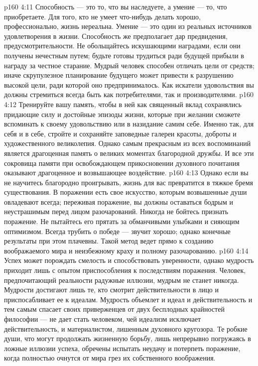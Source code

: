 \vs p160 4:11 Способность --- это то, что вы наследуете, а умение --- то, что приобретаете. Для того, кто не умеет что\hyp{}нибудь делать хорошо, профессионально, жизнь нереальна. Умение --- это один из реальных источников удовлетворения в жизни. Способность же предполагает дар предвидения, предусмотрительности. Не обольщайтесь искушающими наградами, если они получены нечестным путем; будьте готовы трудиться ради будущей прибыли в награду за честное старание. Мудрый человек способен отличать цели от средств; иначе скрупулезное планирование будущего может привести к разрушению высокой цели, ради которой оно предпринималось. Как искатели удовольствия вы должны стремиться всегда быть как потребителями, так и производителями.
\vs p160 4:12 Тренируйте вашу память, чтобы в ней как священный вклад сохранялись придающие силу и достойные эпизоды жизни, которые при желании сможете вспоминать к своему удовольствию или в назидание самим себе. Именно так, для себя и в себе, стройте и сохраняйте заповедные галереи красоты, доброты и художественного великолепия. Однако самым прекрасным из всех воспоминаний является драгоценная память о великих моментах благородной дружбы. И все эти сокровища памяти при освобождающем прикосновении духовного почитания оказывают драгоценное и возвышающее воздействие.
\vs p160 4:13 Однако если вы не научитесь благородно проигрывать, жизнь для вас превратится в тяжкое бремя существования. В поражении есть свое искусство, которым возвышенные души овладевают всегда; переживая поражение, вы должны оставаться бодрым и неустрашимым перед лицом разочарований. Никогда не бойтесь признать поражение. Не пытайтесь его прятать за обманчивыми улыбками и сияющим оптимизмом. Всегда трубить о победе --- звучит хорошо; однако конечные результаты при этом плачевны. Такой метод ведет прямо к созданию воображаемого мира и неизбежному краху и полному разочарованию.
\vs p160 4:14 Успех может порождать смелость и способствовать уверенности, однако мудрость приходит лишь с опытом приспособления к последствиям поражения. Человек, предпочитающий реальности радужные иллюзии, мудрым не станет никогда. Мудрости достигают лишь те, кто смотрит действительности в лицо и приспосабливает ее к идеалам. Мудрость объемлет и идеал и действительность и тем самым спасает своих приверженцев от двух бесплодных крайностей философии --- не дает стать человеком, чей идеализм исключает действительность, и материалистом, лишенным духовного кругозора. Те робкие души, что могут продолжать жизненную борьбу, лишь непрерывно погружаясь в ложные иллюзии успеха, обречены испытать неудачу и потерпеть поражение, когда полностью очнутся от мира грез их собственного воображения.
